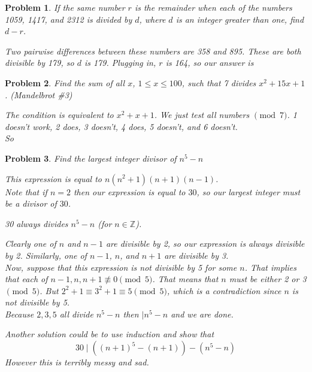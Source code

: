 \documentclass{scrartcl}
\newtheorem{a_problem}{Problem}
\begin{document}
\begin{a_problem}
	If the same number $r$ is the remainder when each of the numbers 1059, 1417, and 2312 is divided by $d$, where $d$ is an integer greater than one, find $d-r$.
	\begin{soln}
		Two pairwise differences between these numbers are 358 and 895. These are both divisible by 179, so $d$ is 179. Plugging in, $r$ is 164, so our answer is 
	\end{soln}
\end{a_problem}

\begin{a_problem}
	Find the sum of all $x$, $1 \leq x \leq 100$, such that 7 divides $x^2 + 15x + 1$. (Mandelbrot \#3)
	\begin{soln}
		The condition is equivalent to $x^2 + x + 1$.
		We just test all numbers $\pmod{7}$.
		1 doesn't work, 2 does, 3 doesn't, 4 does, 5 doesn't, and 6 doesn't. \\
		So 
	\end{soln}
\end{a_problem}

\begin{a_problem}
	Find the largest integer divisor of $n^5 - n$
	\begin{soln}
		This expression is equal to $n(n^2+1)(n+1)(n-1)$. \\
		Note that if $n=2$ then our expression is equal to $30$, so our largest integer must be a divisor of $30$. 
		\begin{claim*}
		30 always divides $n^5 - n$ (for $n \in \mathbb{Z}$). 
		\end{claim*}
		Clearly one of $n$ and $n-1$ are divisible by 2, so our expression is always divisible by 2. Similarly, one of $n-1$, $n$, and $n+1$ are divisible by 3. \\
		Now, suppose that this expression is not divisible by 5 for some $n$.
		That implies that each of $n-1, n, n+1 \not\equiv 0 \pmod{5}$.
		That means that $n$ must be either 2 or 3 $\pmod{5}$.
		But $2^2 + 1 \equiv 3^2 + 1 \equiv 5 \pmod{5}$, which is a contradiction since $n$ is not divisible by 5. \\
		Because $2,3,5$ all divide $n^5 - n$ then $\mid n^5 - n$ and we are done.
	\end{soln}
	\begin{remark}
		Another solution could be to use induction and show that 
		\[30 \mid ((n+1)^5 - (n+1)) - (n^5 - n)\]
		However this is terribly messy and sad.
	\end{remark}
\end{a_problem}
\end{document}
